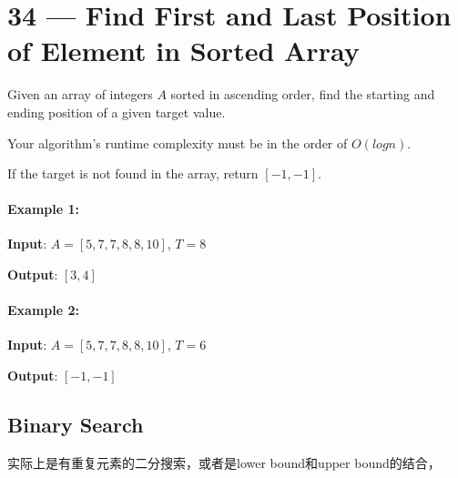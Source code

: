 \section{34 --- Find First and Last Position of Element in Sorted Array}
Given an array of integers $A$ sorted in ascending order, find the starting and ending position of a given target value.

Your algorithm's runtime complexity must be in the order of $O(log n)$.

If the target is not found in the array, return $[-1, -1]$.

\paragraph{Example 1:}

\begin{flushleft}
\textbf{Input}: $A = [5,7,7,8,8,10]$, $T = 8$

\textbf{Output}: $[3,4]$
\end{flushleft}

\paragraph{Example 2:}

\begin{flushleft}
\textbf{Input}: $A = [5,7,7,8,8,10]$, $T = 6$

\textbf{Output}: $[-1,-1]$
\end{flushleft}

\subsection{Binary Search}
实际上是有重复元素的二分搜索，或者是lower bound和upper bound的结合，

